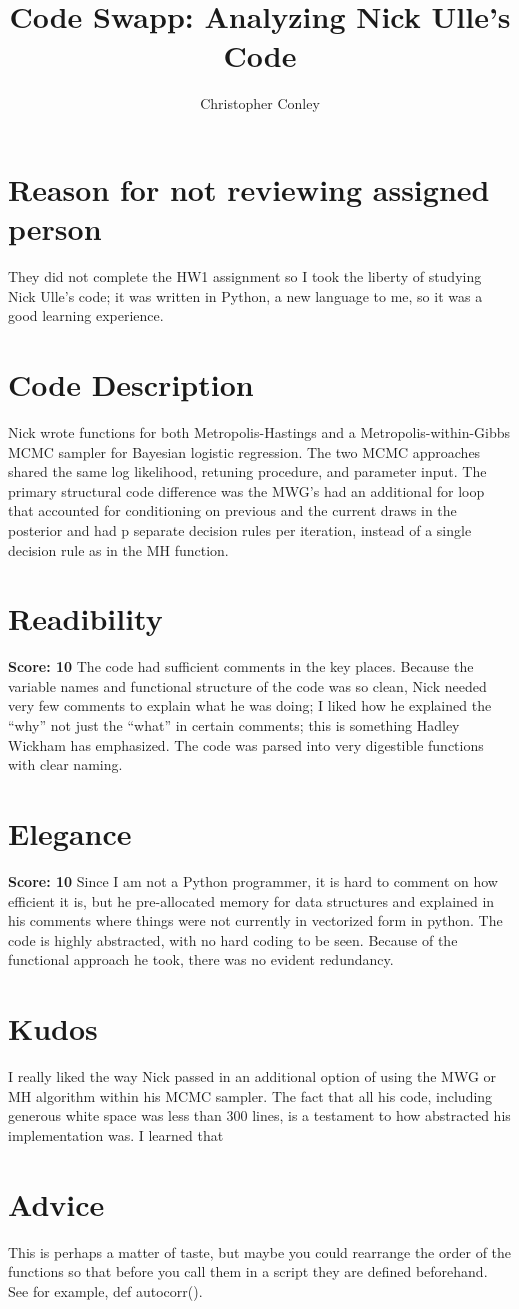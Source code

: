 \documentclass[10pt]{amsart}
\title{Code Swapp: Analyzing Nick Ulle's Code}
\author{Christopher Conley}
\date{}                                           %
\begin{document}
\maketitle

\section{Reason for not reviewing assigned person}
They did not complete the HW1 assignment so I took the liberty of studying Nick Ulle's code; it was written in Python, a new language to me, so it was a good learning experience. 

\section{Code Description}
Nick wrote functions for both Metropolis-Hastings and a Metropolis-within-Gibbs MCMC sampler for Bayesian logistic regression. The two MCMC approaches shared the same log likelihood, retuning procedure, and parameter input. The primary structural code difference was the MWG's had an additional for loop that accounted for conditioning on previous and the current draws in the posterior and had p separate decision rules per iteration, instead of a single decision rule as in the MH function.

\section{Readibility}
{ \bf Score: 10} The code had sufficient comments in the key places. Because the variable names and functional structure of the code was so clean, Nick needed very few comments to explain what he was doing; I liked how he explained the ``why'' not just the ``what'' in certain comments; this is something Hadley Wickham has emphasized. The code was parsed into very digestible functions with clear naming.
 
 \section{Elegance}
 {\bf Score: 10} Since I am not a Python programmer, it is hard to comment on how efficient it is, but he pre-allocated memory for data structures and explained in his comments where things were not currently in vectorized form in python. The code is highly abstracted, with no hard coding to be seen.  Because of the functional approach he took, there was no evident redundancy. 
 
 \section{Kudos}
 I really liked the way Nick passed in an additional option of using the MWG or MH algorithm within his MCMC sampler. 
 The fact that all his code, including generous white space was less than 300 lines, is a testament to how abstracted his implementation was. I learned that 
 
 \section{Advice}
This is perhaps a matter of taste, but maybe you could rearrange the order of the functions so that before you call them in a script they are defined beforehand. See for example, def autocorr(). 
\end{document}
